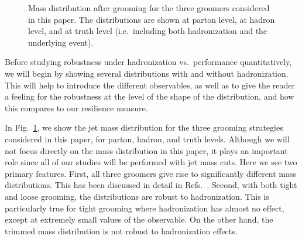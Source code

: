 \documentclass[11pt,letterpaper]{article}
\begin{document}
\begin{figure}
  \caption{Mass distribution after grooming for the three groomers
    considered in this paper. The distributions are shown at parton
    level, at hadron level, and at truth level (i.e.\ including both
    hadronization and the underlying event).}\label{jetsub_2prong_fig:mass-distribution}
\end{figure}

Before studying robustness under hadronization vs.\ performance quantitatively, we will begin by showing several distributions with and without hadronization.
%
This will help to introduce the different observables, as well as to give the reader a feeling for the robustness at the level of the shape of the distribution, and how this compares to our resilience measure. 

In Fig.~\ref{jetsub_2prong_fig:mass-distribution}, we show the jet mass distribution for the three grooming strategies considered in this paper, for parton, hadron, and truth levels.
%
Although we will not focus directly on the mass distribution in this paper, it plays an important role since all of our studies will be performed with jet mass cuts.
%
Here we see two primary features.
%
First, all three groomers give rise to significantly different mass distributions.
%
This has been discussed in detail in Refs.~\cite{Dasgupta:2013ihk,Larkoski:2014wba}.
%
Second, with both tight and loose grooming, the distributions are robust to hadronization.
%
This is particularly true for tight grooming where hadronization has almost no effect, except at extremely small values of the observable.
%
On the other hand, the trimmed mass distribution is not robust to hadronization effects. 
\end{document}
